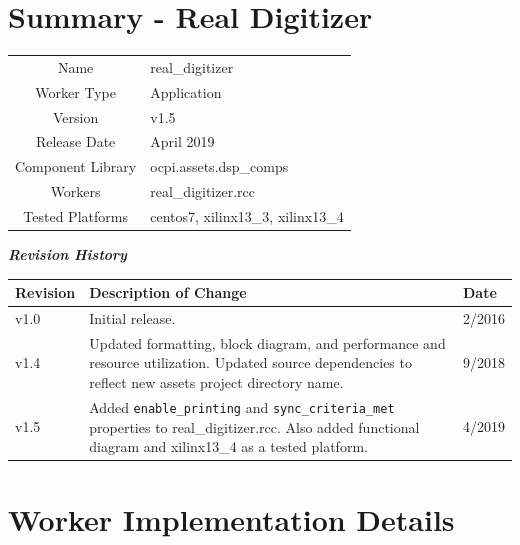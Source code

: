 \documentclass{article}
\author{} %
\date{Version \docVersion} %
\title{\docTitle}
\def\docVersion{1.5}
\def\comp{real\_digitizer}
\def\Comp{Real Digitizer}
\begin{document}
\section*{Summary - \Comp}
\begin{tabular}{|c|M{13.5cm}|}
	\hline
	                  &                                          \\
	\hline
	Name              & \comp                                    \\
	\hline
	Worker Type       & Application                              \\
	\hline
	Version           & v\docVersion \\
	\hline
	Release Date      & April 2019 \\
	\hline
	Component Library & ocpi.assets.dsp\_comps                    \\
	\hline
	Workers           & \comp.rcc                                \\
	\hline
	Tested Platforms  & centos7, xilinx13\_3, xilinx13\_4 \\
	\hline
\end{tabular}
\begin{center}
  \textit{\textbf{Revision History}}
\end{center}
\begin{tabular}{|p{2cm}|p{12cm}|p{2.11cm}|}
  \hline
  \rowcolor{blue}
  \textbf{Revision} & \textbf{Description of Change} & \textbf{Date} \\
  \hline
  v1.0 & Initial release. & 2/2016 \\
  \hline
  v1.4 & Updated formatting, block diagram, and performance and resource utilization. Updated source dependencies to reflect new assets project directory name. & 9/2018 \\
  \hline
  v1.5 & Added \verb+enable_printing+ and \verb+sync_criteria_met+ properties to \comp{}.rcc. Also added functional diagram and xilinx13\_4 as a tested platform. & 4/2019 \\
  \hline
\end{tabular}

\section*{Worker Implementation Details}
\end{document}
